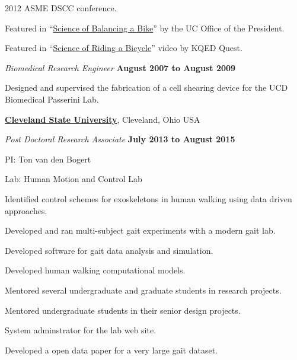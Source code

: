 \documentclass[10pt]{article}
\newenvironment{outerlist}[1][\enskip\textbullet]%
        {\begin{itemize}[#1]}{\end{itemize}%
         \vspace{-.6\baselineskip}}
\newenvironment{innerlist}[1][\enskip\textbullet]%
        {\begin{compactitem}[#1]}{\end{compactitem}}
\newcommand{\blankline}{\quad\pagebreak[2]}
\begin{document}
\begin{outerlist}
\begin{innerlist}
      2012 ASME DSCC conference.
    \item Featured in ``\href{http://youtu.be/HcYbn_RCLiw}{Science of
      Balancing a Bike}'' by the UC Office of the President.
    \item Featured in ``\href{http://youtu.be/zShn5xMueso}{Science of Riding a
      Bicycle}'' video by KQED Quest.
  \end{innerlist}
  \item[] \textit{Biomedical Research Engineer}%
        \hfill \textbf{August 2007 to August 2009}
  \begin{innerlist}
    \item Designed and supervised the fabrication of a cell shearing device for
      the UCD Biomedical Passerini Lab.
  \end{innerlist}
\end{outerlist}

\blankline

\href{http://csuohio.edu}{\textbf{Cleveland State University}}, Cleveland, Ohio USA
\begin{outerlist}
  \item[] \textit{Post Doctoral Research Associate}
    \hfill \textbf{July 2013 to August 2015}
  \begin{innerlist}
    \item PI: Ton van den Bogert
    \item Lab: Human Motion and Control Lab
    \item Identified control schemes for exoskeletons in human walking using
      data driven approaches.
    \item Developed and ran multi-subject gait experiments with a modern gait
      lab.
    \item Developed software for gait data analysis and simulation.
    \item Developed human walking computational models.
    \item Mentored several undergraduate and graduate students in research
      projects.
    \item Mentored undergraduate students in their senior design projects.
    \item System adminstrator for the lab web site.
    \item Developed a open data paper for a very large gait dataset.
  \end{innerlist}
\end{outerlist}
\end{document}
